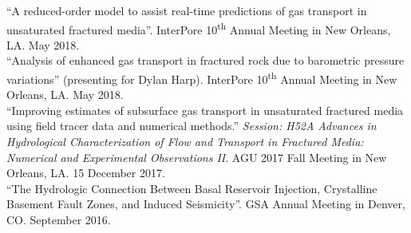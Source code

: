 \documentclass[11pt, letterpaper]{article}
\newcommand{\years}[1]{\marginnote{\scriptsize #1}}
\begin{document}
``A reduced-order model to assist real-time predictions of gas transport in
unsaturated fractured media''. InterPore 10\textsuperscript{th} Annual Meeting in
New Orleans, LA. May 2018.\\
%
\years{2018}
``Analysis of enhanced gas transport in fractured rock due to barometric pressure
variations'' (presenting for Dylan Harp). InterPore 10\textsuperscript{th} Annual
Meeting in New Orleans, LA. May 2018.\\
%
\years{2017}
``Improving estimates of subsurface gas transport in unsaturated fractured media
using field tracer data and numerical methods.''  \textit{Session: H52A Advances
    in Hydrological Characterization of Flow and Transport in Fractured Media:
Numerical and Experimental Observations II}. AGU 2017 Fall Meeting in New
Orleans, LA. 15 December 2017. \\
%
\years{2016}
``The Hydrologic Connection Between Basal Reservoir Injection, Crystalline
Basement Fault Zones, and Induced Seismicity''.  GSA Annual Meeting in Denver,
CO. September 2016.\\
\end{document}

